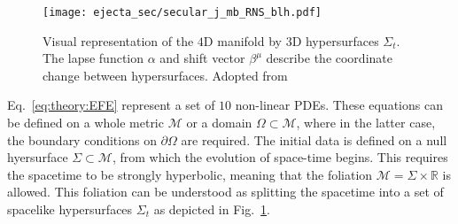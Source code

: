 \begin{figure}[t]
    \centering 
    \texttt{[image: ejecta\_sec/secular\_j\_mb\_RNS\_blh.pdf]}
    \caption{
        Visual representation of the $4$D manifold  by $3$D hypersurfaces 
        $\Sigma_t$. The lapse function $\alpha$ and shift vector $\beta^{\mu}$ describe the 
        coordinate change between hypersurfaces.
        Adopted from \cite{Dietrich:2016phd}
    }
    \label{fig:theory:3p1}
\end{figure}

Eq.~\eqref{eq:theory:EFE} represent a set of $10$ non-linear \acp{PDE}. 
These equations can be defined on a whole metric $\mathcal{M}$ or a domain $\Omega\subset\mathcal{M}$,
where in the latter case, the boundary conditions on $\partial\Omega$ are required. 
%
The initial data is defined on a null hyersurface $\Sigma\subset\mathcal{M}$, 
from which the evolution of space-time begins. 
This requires the spacetime to be strongly hyperbolic, 
meaning that the foliation $\mathcal{M}=\Sigma\times\mathbb{R}$ is allowed. 
This foliation can be understood as splitting the spacetime into a set of 
spacelike hypersurfaces $\Sigma_t$ as depicted in Fig.~\ref{fig:theory:3p1}. 


